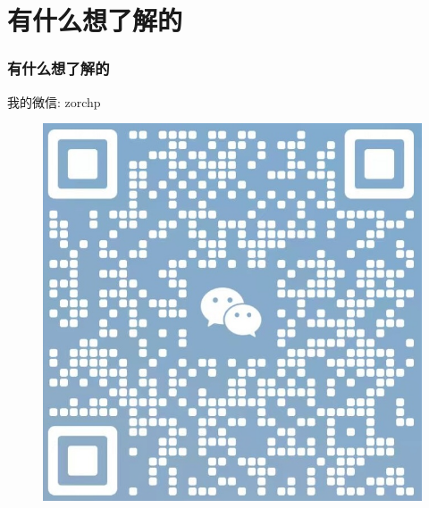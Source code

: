 \documentclass{ctexbeamer}
\begin{document}
\section{有什么想了解的}

\begin{frame}
	\frametitle{有什么想了解的}

	我的微信: zorchp
	\begin{figure}\centering
		\includegraphics[width=.5\textwidth]{figures/my.jpg}
	\end{figure}
\end{frame}

\begin{frame}{}
	\begin{center}
	\end{center}
\end{frame}
\end{document}

